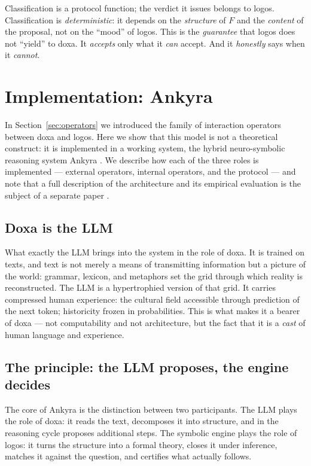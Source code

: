 \documentclass[12pt,a4paper]{article}
\begin{document}
Classification is a protocol function; the verdict it issues belongs to logos.
Classification is \emph{deterministic}: it depends on the \emph{structure} of
$F$ and the \emph{content} of the proposal, not on the ``mood'' of logos. This
is the \emph{guarantee} that logos does not ``yield'' to doxa. It
\emph{accepts} only what it \emph{can} accept. And it \emph{honestly} says when
it \emph{cannot}.

\section{Implementation: Ankyra}
\label{sec:implementation}

In Section~\ref{sec:operators} we introduced the family of interaction
operators between doxa and logos. Here we show that this model is not a
theoretical construct: it is implemented in a working system, the hybrid
neuro-symbolic reasoning system Ankyra \cite{ankyra}. We describe how each of
the three roles is implemented --- external operators, internal operators, and
the protocol --- and note that a full description of the architecture and its
empirical evaluation is the subject of a separate paper
\cite{ankyra_paper}.

\subsection{Doxa is the LLM}
\label{sec:llm_doxa}

What exactly the LLM brings into the system in the role of doxa. It is trained
on texts, and text is not merely a means of transmitting information but a
picture of the world: grammar, lexicon, and metaphors set the grid through
which reality is reconstructed. The LLM is a hypertrophied version of that
grid. It carries compressed human experience: the cultural field accessible
through prediction of the next token; historicity frozen in probabilities.
This is what makes it a bearer of doxa --- not computability and not
architecture, but the fact that it is a \emph{cast} of human language and
experience.

\subsection{The principle: the LLM proposes, the engine decides}
\label{sec:principle}

The core of Ankyra is the distinction between two participants. The LLM plays
the role of doxa: it reads the text, decomposes it into structure, and in the
reasoning cycle proposes additional steps. The symbolic engine plays the role
of logos: it turns the structure into a formal theory, closes it under
inference, matches it against the question, and certifies what actually
follows.
\end{document}
